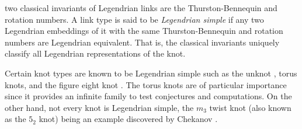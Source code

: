 \documentclass{article}
\theoremstyle{plain}
\begin{document}
        two classical invariants of Legendrian links are the Thurston-Bennequin
        and rotation numbers. A link type is said to be
        \textit{Legendrian simple} if any two Legendrian embeddings of it with
        the same Thurston-Bennequin and rotation numbers are Legendrian
        equivalent. That is, the classical invariants uniquely classify all
        Legendrian representations of the knot.
        \par\hfill\par
        Certain knot types are known to be Legendrian simple such as the unknot
        \cite{EliashbergFraserClassificationTopTrivialLegKnots}, torus knots,
        and the figure eight knot \cite{EtnyreHondaContactTopologyI}. The torus
        knots are of particular importance since it provides an infinite
        family to test conjectures and computations. On the other hand,
        not every knot is Legendrian simple, the $m_{3}$ twist knot (also
        known as the $5_{2}$ knot) being an example discovered by Chekanov
        \cite{ChekanovDifAlgOfLegLinks}.
\end{document}
